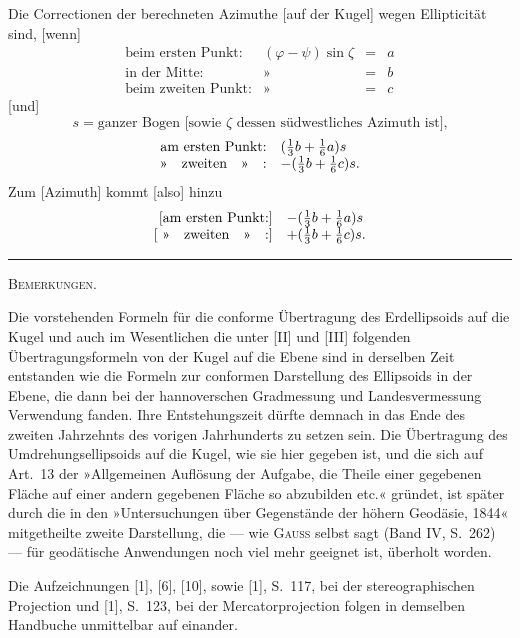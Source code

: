 Die Correctionen der berechneten Azimuthe [auf der Kugel] wegen Ellipticität sind, [wenn]
\[
\begin{array}{rccl}
\text{beim ersten Punkt:}&(\varphi-\psi)\sin\zeta&=&a\\
\text{in der Mitte:}&\text{»}&=&b\\
\text{beim zweiten Punkt:}&\text{»}&=&c
\end{array}
\]
[und]
\[
s=\text{ganzer Bogen [sowie $\zeta$ dessen südwestliches Azimuth ist],}
\]
\[
\begin{array}{rl}
\text{am ersten Punkt:}&(\tfrac13b+\tfrac16a)s\\
\text{»\quad zweiten\quad »\quad :}&-(\tfrac13b+\tfrac16c)s.
\end{array}
\]
Zum  [Azimuth] kommt [also] hinzu
\[
\begin{array}{rl}
\text{[am ersten Punkt:]}&-(\tfrac13b+\tfrac16a)s\\
\text{[ »\quad zweiten\quad »\quad :]}&+(\tfrac13b+\tfrac16c)s.
\end{array}
\]
\begin{center}\rule{.18\textwidth}{.4pt}\par\vspace{12mm}\textsc{Bemerkungen.}\end{center}
\begingroup\small
Die vorstehenden Formeln für die conforme Übertragung des Erdellipsoids auf die Kugel und auch im Wesentlichen die unter [II] und [III] folgenden Übertragungsformeln von der Kugel auf die Ebene sind in derselben Zeit entstanden wie die Formeln zur conformen Darstellung des Ellipsoids in der Ebene, die dann bei der hannoverschen Gradmessung und Landesvermessung Verwendung fanden. Ihre Entstehungszeit dürfte demnach in das Ende des zweiten Jahrzehnts des vorigen Jahrhunderts zu setzen sein. Die Übertragung des Umdrehungsellipsoids auf die Kugel, wie sie hier gegeben ist, und die sich auf Art.~13 der »Allgemeinen Auflösung der Aufgabe, die Theile einer gegebenen Fläche auf einer andern gegebenen Fläche so abzubilden etc.« gründet, ist später durch die in den »Untersuchungen über Gegenstände der höhern Geodäsie, 1844« mitgetheilte zweite Darstellung, die --- wie \textsc{Gauss} selbst sagt (Band IV, S.~262) --- für geodätische Anwendungen noch viel mehr geeignet ist, überholt worden.

Die Aufzeichnungen [1], [6], [10], sowie [1], S.~117, bei der stereographischen Projection und [1], S.~123, bei der Mercatorprojection folgen in demselben Handbuche unmittelbar auf einander.

